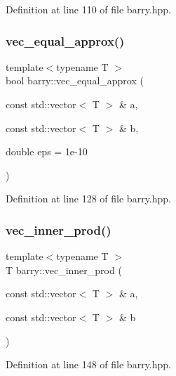 Definition at line 110 of file barry.\+hpp.

\mbox{\label{namespacebarry_a24c4bd4a99dd82edf66c2d3b645dca08}} 
\subsubsection{\texorpdfstring{vec\+\_\+equal\+\_\+approx()}{vec\_equal\_approx()}}
{\footnotesize\ttfamily template$<$typename T $>$ \\
bool barry\+::vec\+\_\+equal\+\_\+approx (\begin{DoxyParamCaption}\item[{const std\+::vector$<$ T $>$ \&}]{a,  }\item[{const std\+::vector$<$ T $>$ \&}]{b,  }\item[{double}]{eps = {\ttfamily 1e-\/10} }\end{DoxyParamCaption})\hspace{0.3cm}{\ttfamily [inline]}}



Definition at line 128 of file barry.\+hpp.

\mbox{\label{namespacebarry_a0343fb4152724d5fa1ffa00d4b6182d9}} 
\subsubsection{\texorpdfstring{vec\+\_\+inner\+\_\+prod()}{vec\_inner\_prod()}}
{\footnotesize\ttfamily template$<$typename T $>$ \\
T barry\+::vec\+\_\+inner\+\_\+prod (\begin{DoxyParamCaption}\item[{const std\+::vector$<$ T $>$ \&}]{a,  }\item[{const std\+::vector$<$ T $>$ \&}]{b }\end{DoxyParamCaption})\hspace{0.3cm}{\ttfamily [inline]}}



Definition at line 148 of file barry.\+hpp.

